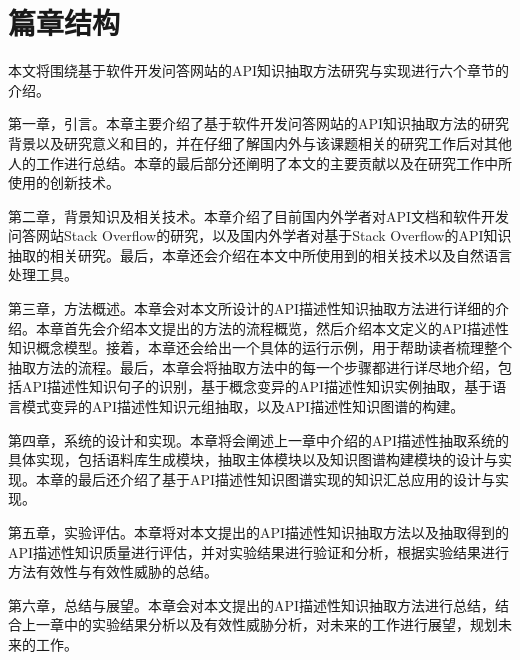 \section{篇章结构}
本文将围绕基于软件开发问答网站的API知识抽取方法研究与实现进行六个章节的介绍。

第一章，引言。本章主要介绍了基于软件开发问答网站的API知识抽取方法的研究背景以及研究意义和目的，并在仔细了解国内外与该课题相关的研究工作后对其他人的工作进行总结。本章的最后部分还阐明了本文的主要贡献以及在研究工作中所使用的创新技术。

第二章，背景知识及相关技术。本章介绍了目前国内外学者对API文档和软件开发问答网站Stack Overflow的研究，以及国内外学者对基于Stack Overflow的API知识抽取的相关研究。最后，本章还会介绍在本文中所使用到的相关技术以及自然语言处理工具。

第三章，方法概述。本章会对本文所设计的API描述性知识抽取方法进行详细的介绍。本章首先会介绍本文提出的方法的流程概览，然后介绍本文定义的API描述性知识概念模型。接着，本章还会给出一个具体的运行示例，用于帮助读者梳理整个抽取方法的流程。最后，本章会将抽取方法中的每一个步骤都进行详尽地介绍，包括API描述性知识句子的识别，基于概念变异的API描述性知识实例抽取，基于语言模式变异的API描述性知识元组抽取，以及API描述性知识图谱的构建。

第四章，系统的设计和实现。本章将会阐述上一章中介绍的API描述性抽取系统的具体实现，包括语料库生成模块，抽取主体模块以及知识图谱构建模块的设计与实现。本章的最后还介绍了基于API描述性知识图谱实现的知识汇总应用的设计与实现。

第五章，实验评估。本章将对本文提出的API描述性知识抽取方法以及抽取得到的API描述性知识质量进行评估，并对实验结果进行验证和分析，根据实验结果进行方法有效性与有效性威胁的总结。

第六章，总结与展望。本章会对本文提出的API描述性知识抽取方法进行总结，结合上一章中的实验结果分析以及有效性威胁分析，对未来的工作进行展望，规划未来的工作。




